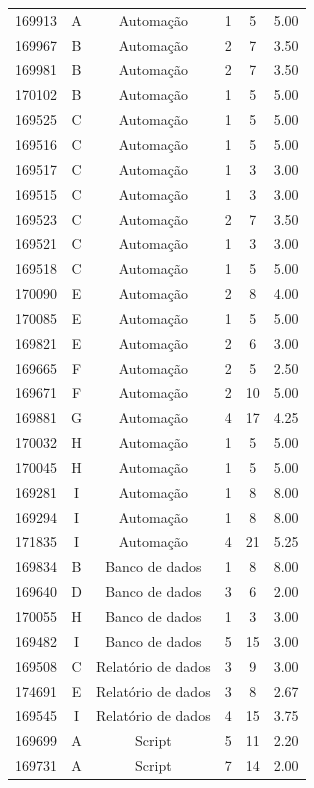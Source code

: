\begin{longtable}{cccccc}
		169913 & A & Automação & 1 & 5 & 5.00 \\
		169967 & B & Automação & 2 & 7 & 3.50 \\
		169981 & B & Automação & 2 & 7 & 3.50 \\
		170102 & B & Automação & 1 & 5 & 5.00 \\
		169525 & C & Automação & 1 & 5 & 5.00 \\
		169516 & C & Automação & 1 & 5 & 5.00 \\
		169517 & C & Automação & 1 & 3 & 3.00 \\
		169515 & C & Automação & 1 & 3 & 3.00 \\
		169523 & C & Automação & 2 & 7 & 3.50 \\
		169521 & C & Automação & 1 & 3 & 3.00 \\
		169518 & C & Automação & 1 & 5 & 5.00 \\
		170090 & E & Automação & 2 & 8 & 4.00 \\
		170085 & E & Automação & 1 & 5 & 5.00 \\
		169821 & E & Automação & 2 & 6 & 3.00 \\
		169665 & F & Automação & 2 & 5 & 2.50 \\
		169671 & F & Automação & 2 & 10 & 5.00 \\
		169881 & G & Automação & 4 & 17 & 4.25 \\
		170032 & H & Automação & 1 & 5 & 5.00 \\
		170045 & H & Automação & 1 & 5 & 5.00 \\
		169281 & I & Automação & 1 & 8 & 8.00 \\
		169294 & I & Automação & 1 & 8 & 8.00 \\
		171835 & I & Automação & 4 & 21 & 5.25 \\
		169834 & B & Banco de dados & 1 & 8 & 8.00 \\
		169640 & D & Banco de dados & 3 & 6 & 2.00 \\
		170055 & H & Banco de dados & 1 & 3 & 3.00 \\
		169482 & I & Banco de dados & 5 & 15 & 3.00 \\
		169508 & C & Relatório de dados & 3 & 9 & 3.00 \\
		174691 & E & Relatório de dados & 3 & 8 & 2.67 \\
		169545 & I & Relatório de dados & 4 & 15 & 3.75 \\
		169699 & A & Script & 5 & 11 & 2.20 \\
		169731 & A & Script & 7 & 14 & 2.00 \\

\end{longtable}
